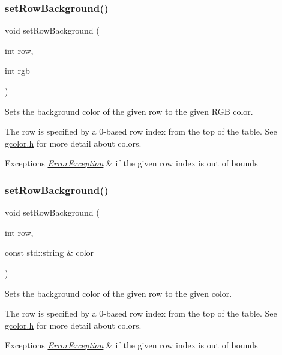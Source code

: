 \subsubsection{\texorpdfstring{set\+Row\+Background()}{setRowBackground()}\hspace{0.1cm}{\footnotesize\ttfamily [1/2]}}
{\footnotesize\ttfamily void set\+Row\+Background (\begin{DoxyParamCaption}\item[{int}]{row,  }\item[{int}]{rgb }\end{DoxyParamCaption})\hspace{0.3cm}{\ttfamily [virtual]}}



Sets the background color of the given row to the given R\+GB color. 

The row is specified by a 0-\/based row index from the top of the table. See \mbox{\hyperlink{gcolor_8h_source}{gcolor.\+h}} for more detail about colors. 
\begin{DoxyExceptions}{Exceptions}
{\em \mbox{\hyperlink{classErrorException}{Error\+Exception}}} & if the given row index is out of bounds \\
\hline
\end{DoxyExceptions}
\mbox{\label{classGTable_a30c7073dfeac833056ed65a8bb9a7e08}} 
\subsubsection{\texorpdfstring{set\+Row\+Background()}{setRowBackground()}\hspace{0.1cm}{\footnotesize\ttfamily [2/2]}}
{\footnotesize\ttfamily void set\+Row\+Background (\begin{DoxyParamCaption}\item[{int}]{row,  }\item[{const std\+::string \&}]{color }\end{DoxyParamCaption})\hspace{0.3cm}{\ttfamily [virtual]}}



Sets the background color of the given row to the given color. 

The row is specified by a 0-\/based row index from the top of the table. See \mbox{\hyperlink{gcolor_8h_source}{gcolor.\+h}} for more detail about colors. 
\begin{DoxyExceptions}{Exceptions}
{\em \mbox{\hyperlink{classErrorException}{Error\+Exception}}} & if the given row index is out of bounds \\
\hline
\end{DoxyExceptions}
\mbox{\label{classGTable_a0d4a1d2a58daff8c1984e31b21f93ea1}} 
